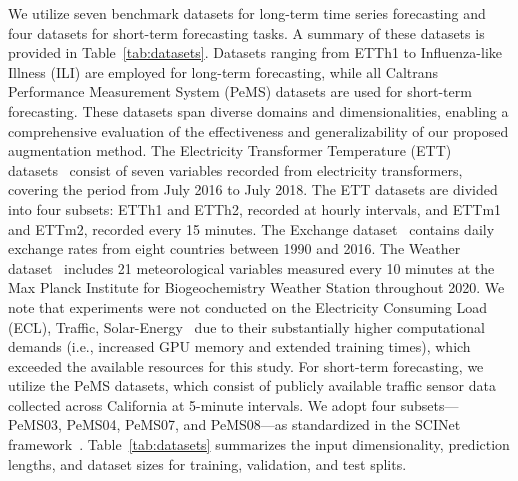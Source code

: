 We utilize seven benchmark datasets for long-term time series forecasting and four datasets for short-term forecasting tasks. A summary of these datasets is provided in Table~\ref{tab:datasets}. Datasets ranging from ETTh1 to Influenza-like Illness (ILI) are employed for long-term forecasting, while all Caltrans Performance Measurement System (PeMS) datasets are used for short-term forecasting. These datasets span diverse domains and dimensionalities, enabling a comprehensive evaluation of the effectiveness and generalizability of our proposed augmentation method.
The Electricity Transformer Temperature (ETT) datasets~\cite{zhou2021informerefficienttransformerlong} consist of seven variables recorded from electricity transformers, covering the period from July 2016 to July 2018. The ETT datasets are divided into four subsets: ETTh1 and ETTh2, recorded at hourly intervals, and ETTm1 and ETTm2, recorded every 15 minutes.
The Exchange dataset~\cite{wu2022autoformerdecompositiontransformersautocorrelation} contains daily exchange rates from eight countries between 1990 and 2016. The Weather dataset~\cite{wu2022autoformerdecompositiontransformersautocorrelation} includes 21 meteorological variables measured every 10 minutes at the Max Planck Institute for Biogeochemistry Weather Station throughout 2020. We note that experiments were not conducted on the Electricity Consuming Load (ECL), Traffic, Solar-Energy~\cite{lai2018modelinglongshorttermtemporal} due to their substantially higher computational demands (i.e., increased GPU memory and extended training times), which exceeded the available resources for this study.
For short-term forecasting, we utilize the PeMS datasets, which consist of publicly available traffic sensor data collected across California at 5-minute intervals. We adopt four subsets—PeMS03, PeMS04, PeMS07, and PeMS08—as standardized in the SCINet framework~\cite{liu2022scinettimeseriesmodeling}. Table~\ref{tab:datasets} summarizes the input dimensionality, prediction lengths, and dataset sizes for training, validation, and test splits.

